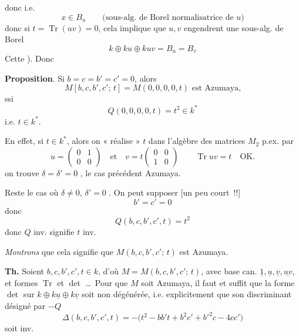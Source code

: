 \documentclass[11pt,a4paper]{article}
\begin{document}
donc i.e.
\[
x \in B_u \qquad \text{(sous-alg. de Borel normalisatrice de $u$)}
\]
donc si $t = \operatorname{Tr}(uv) = 0$, cela implique que $u, v$ engendrent une sous-alg. de Borel
\[
k \oplus ku \oplus kuv = B_u = B_v
\]
Cette \ill{} \ill{}). Donc

\textbf{Proposition}. Si $b = c = b' = c' = 0$, alors
\[
M[b, c, b', c';\, t] = M(0, 0, 0, 0, t) \text{ est Azumaya,}
\]
 ssi
\[
Q(0, 0, 0, 0, t) = t^2 \in k^*
\]
i.e. $t \in k^*$.

En effet, si $t \in k^*$, alors on « réalise » $t$ dans l'algèbre des matrices $M_2$ p.ex. par 
\[
u = \begin{pmatrix} 0 & 1\\ 0 & 0 \end{pmatrix} \quad \text{et} \quad v = t\begin{pmatrix} 0 & 0\\ 1 & 0 \end{pmatrix}
\qquad
\operatorname{Tr} uv = t \quad \text{OK.}
\]
\ill{} on trouve \ill{} \ill{}  $\delta = \delta' = 0$ \ill{}, le cas précédent \ill{} \ill{}  \ill{} \ill{} Azumaya.

 Reste le cas où $\delta \neq 0$, $\delta' = 0$ \struck{\ill{}}. On peut supposer [un peu court~!!]
\[
b' = c' = 0
\]
donc 
\[
Q(b, c, b', c', t) = t^2
\]
donc $Q$ inv. signifie $t$ inv.

\emph{Montrons} que cela signifie que $M(b, c, b', c';\, t)$ est Azumaya.

\textbf{Th.} Soient $b, c, b', c', t \in k$, d'où $M = M(b, c, b', c';\, t)$, avec base can. $\underline{1}, \underline{u}, \underline{v}, \underline{uv}$, et formes $\operatorname{Tr}$ et $\det$ \ldots\ Pour que $M$ soit Azumaya, il faut et suffit que la forme $\det$ sur $k \oplus k\underline{u} \oplus k\underline{v}$ soit non dégénérée, i.e. explicitement que son discriminant  désigné par $-Q$
\[
\Delta(b, c, b', c', t) = -\bigl(t^2 - bb't + b^2c' + b'^2c - 4cc'\bigr)
\]
soit inv.
\end{document}
